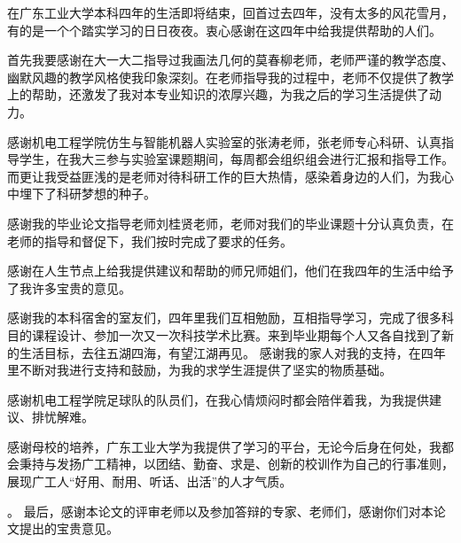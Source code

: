 在广东工业大学本科四年的生活即将结束，回首过去四年，没有太多的风花雪月，有的是一个个踏实学习的日日夜夜。衷心感谢在这四年中给我提供帮助的人们。\par
首先我要感谢在大一大二指导过我画法几何的莫春柳老师，老师严谨的教学态度、幽默风趣的教学风格使我印象深刻。在老师指导我的过程中，老师不仅提供了教学上的帮助，还激发了我对本专业知识的浓厚兴趣，为我之后的学习生活提供了动力。\par
感谢机电工程学院仿生与智能机器人实验室的张涛老师，张老师专心科研、认真指导学生，在我大三参与实验室课题期间，每周都会组织组会进行汇报和指导工作。而更让我受益匪浅的是老师对待科研工作的巨大热情，感染着身边的人们，为我心中埋下了科研梦想的种子。\par
感谢我的毕业论文指导老师刘桂贤老师，老师对我们的毕业课题十分认真负责，在老师的指导和督促下，我们按时完成了要求的任务。\par
感谢在人生节点上给我提供建议和帮助的师兄师姐们，他们在我四年的生活中给予了我许多宝贵的意见。\par
感谢我的本科宿舍的室友们，四年里我们互相勉励，互相指导学习，完成了很多科目的课程设计、参加一次又一次科技学术比赛。来到毕业期每个人又各自找到了新的生活目标，去往五湖四海，有望江湖再见。
感谢我的家人对我的支持，在四年里不断对我进行支持和鼓励，为我的求学生涯提供了坚实的物质基础。\par
感谢机电工程学院足球队的队员们，在我心情烦闷时都会陪伴着我，为我提供建议、排忧解难。\par
感谢母校的培养，广东工业大学为我提供了学习的平台，无论今后身在何处，我都会秉持与发扬广工精神，以团结、勤奋、求是、创新的校训作为自己的行事准则，展现广工人“好用、耐用、听话、出活”的人才气质。\par。
最后，感谢本论文的评审老师以及参加答辩的专家、老师们，感谢你们对本论文提出的宝贵意见。